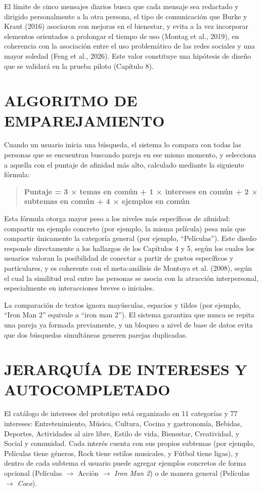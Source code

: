 El límite de cinco mensajes diarios busca que cada mensaje sea redactado y dirigido personalmente a la otra persona, el tipo de comunicación que Burke y Kraut (2016) asociaron con mejoras en el bienestar, y evita a la vez incorporar elementos orientados a prolongar el tiempo de uso (Montag et al., 2019), en coherencia con la asociación entre el uso problemático de las redes sociales y una mayor soledad (Feng et al., 2026). Este valor constituye una hipótesis de diseño que se validará en la prueba piloto (Capítulo 8).

\section{ALGORITMO DE EMPAREJAMIENTO}
Cuando un usuario inicia una búsqueda, el sistema lo compara con todas las personas que se encuentran buscando pareja en ese mismo momento, y selecciona a aquella con el puntaje de afinidad más alto, calculado mediante la siguiente fórmula:

\begin{quote}
\textbf{Puntaje = 3 × temas en común + 1 × intereses en común + 2 × subtemas en común + 4 × ejemplos en común}
\end{quote}

Esta fórmula otorga mayor peso a los niveles más específicos de afinidad: compartir un ejemplo concreto (por ejemplo, la misma película) pesa más que compartir únicamente la categoría general (por ejemplo, ``Películas''). Este diseño responde directamente a los hallazgos de los Capítulos 4 y 5, según los cuales los usuarios valoran la posibilidad de conectar a partir de gustos específicos y particulares, y es coherente con el meta-análisis de Montoya et al. (2008), según el cual la similitud real entre las personas se asocia con la atracción interpersonal, especialmente en interacciones breves o iniciales.

La comparación de textos ignora mayúsculas, espacios y tildes (por ejemplo, ``Iron Man 2'' equivale a ``iron man 2''). El sistema garantiza que nunca se repita una pareja ya formada previamente, y un bloqueo a nivel de base de datos evita que dos búsquedas simultáneas generen parejas duplicadas.


\section{JERARQUÍA DE INTERESES Y AUTOCOMPLETADO}
El catálogo de intereses del prototipo está organizado en 11 categorías y 77 intereses: Entretenimiento, Música, Cultura, Cocina y gastronomía, Bebidas, Deportes, Actividades al aire libre, Estilo de vida, Bienestar, Creatividad, y Social y comunidad. Cada interés cuenta con sus propios subtemas (por ejemplo, Películas tiene géneros, Rock tiene estilos musicales, y Fútbol tiene ligas), y dentro de cada subtema el usuario puede agregar ejemplos concretos de forma opcional (Películas $\rightarrow$ Acción $\rightarrow$ \textit{Iron Man 2}) o de manera general (Películas $\rightarrow$ \textit{Coco}).

